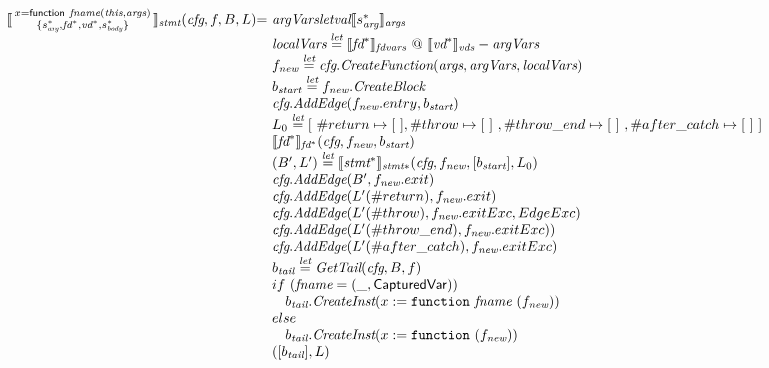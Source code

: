 \[
\begin{array}{l@{}l@{~}l}
\transfun{\irfunexprsmall{x}{\emph{fname}}{\emph{this}}{\emph{args}}{s_{\emph{arg}}^*}{\emph{fd}^*}{\emph{vd}^*}{s_{\emph{body}}^*}}_{\emph{stmt}}(\emph{cfg}, f, B, L) & = &
\emph{argVars} \emph{letval} \transfun{s_{\emph{arg}}^*}_{\emph{args}} \\
& & \emph{localVars} \letval \transfun{\emph{fd}^*}_{\emph{fdvars}} ~@~ \transfun{\emph{vd}^*}_{\emph{vds}} - \emph{argVars} \\
& & f_{\emph{new}} \letval \emph{cfg}.\emph{CreateFunction}(\emph{args}, \emph{argVars}, \emph{localVars})\\
& & b_{\emph{start}} \letval f_{\emph{new}}.\emph{CreateBlock}\\
& & \emph{cfg}.\emph{AddEdge}(f_{\emph{new}}.entry, b_{\emph{start}})\\
& & L_0 \letval [\ \#return \mapsto [\ ], \#throw \mapsto [\ ]\ , \#throw\_end \mapsto [\ ]\ , \#after\_catch \mapsto [\ ]\ ] \\
& & \transfun{\emph{fd}^*}_{\emph{fd}^*}(\emph{cfg}, f_{\emph{new}}, b_{\emph{start}})\\
& & (B', L') \letval \transfun{\emph{stmt}^*}_{\emph{stmt}*}(\emph{cfg}, f_{\emph{new}}, [b_{\emph{start}}], L_0)\\
& & \emph{cfg}.\emph{AddEdge}(B', f_{\emph{new}}.exit)\\
& & \emph{cfg}.\emph{AddEdge}(L'(\#return), f_{\emph{new}}.exit)\\
& & \emph{cfg}.\emph{AddEdge}(L'(\#throw), f_{\emph{new}}.exitExc, EdgeExc)\\
& & \emph{cfg}.\emph{AddEdge}(L'(\#throw\_end),f_{\emph{new}}.exitExc))\\
& & \emph{cfg}.\emph{AddEdge}(L'(\#after\_catch),f_{\emph{new}}.exitExc)\\
& & b_{\emph{tail}} \letval \GetTail(\emph{cfg}, B, f)\\
& & if\ (\emph{fname} = (\_, \SF{CapturedVar})) \\
& & \phantom{if} b_{\emph{tail}}.\emph{CreateInst}(x := \TT{function}\ \emph{fname}\ (f_{\emph{new}}))\\
& & else\ \\
& & \phantom{if} b_{\emph{tail}}.\emph{CreateInst}(x := \TT{function}\ (f_{\emph{new}}))\\
& & ([b_{\emph{tail}}], L)\\
& & \\


\end{array}\]
